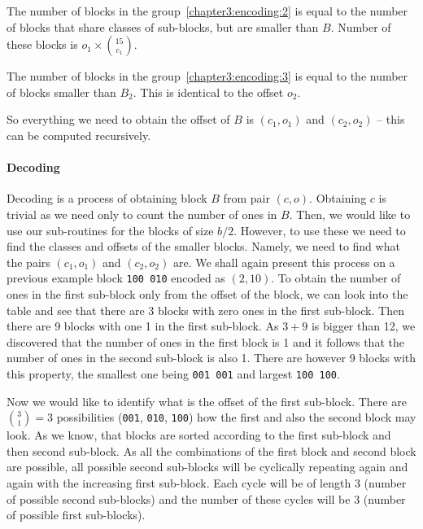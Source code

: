The number of blocks in the group~\ref{chapter3:encoding:2} is equal to the number of blocks that
share classes of sub-blocks, but are smaller than $B$. Number of these blocks is $o_1\times {15\choose c_1}$.

The number of blocks in the group~\ref{chapter3:encoding:3} is equal to the number of blocks smaller 
than $B_2$. This is identical to the offset $o_2$.

So everything we need to obtain the offset of $B$ is $(c_1, o_1)$ and $(c_2, o_2)$ -- this can be computed
recursively.

\paragraph{Decoding}

Decoding is a process of obtaining block $B$ from pair $(c, o)$. Obtaining $c$ is trivial as we need
only to count the number of ones in $B$. Then, we would like to use our sub-routines for the blocks
of size $b/2$. However, to use these we need to find the classes and offsets of the smaller
blocks. Namely, we need to find what the pairs $(c_1, o_1)$ and $(c_2, o_2)$ are. We shall again
present this process on a previous example block {\tt 100 010} encoded as $(2, 10)$. To obtain the
number of ones in the first sub-block only from the offset of the block, we can look into
the table and see that there are 3 blocks with zero ones in the first sub-block. Then there are 9
blocks with one 1 in the first sub-block. As $3+9$ is bigger than 12, we discovered that the number
of ones in the first block is 1 and it follows that the number of ones in the second sub-block is also 1.
There are however 9 blocks with this property, the smallest one being {\tt 001 001} and largest
{\tt 100 100}. 

Now we would like to identify what is the offset of the first sub-block. There are ${3 \choose 1} = 3$
possibilities ({\tt 001}, {\tt 010}, {\tt 100}) how the first and also the second block may look.
As we know, that blocks are sorted according to the first sub-block and then second sub-block. As
all the combinations of the first block and second block are possible, all possible second sub-blocks
will be cyclically repeating again and again with the increasing first sub-block. Each cycle will
be of length 3 (number of possible second sub-blocks) and the number of these cycles will be 3
(number of possible first sub-blocks). 


